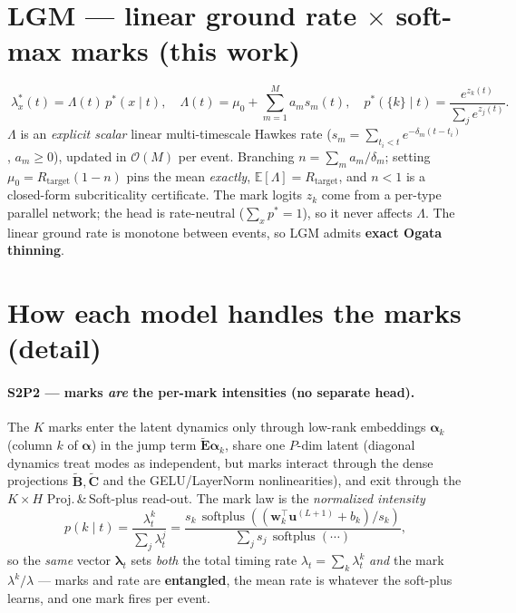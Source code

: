 \documentclass[11pt]{article}
\newcommand{\softplus}{\operatorname{softplus}}
\newcommand{\Lam}{\Lambda}
\begin{document}
\section{LGM --- linear ground rate $\times$ soft-max marks (this work)}
\[
\boxed{\;\lambda_x^*(t)=\Lam(t)\,p^*(x\mid t),\quad
\Lam(t)=\mu_0+\sum_{m=1}^{M}a_m s_m(t),\quad
p^*(\{k\}\mid t)=\frac{e^{z_k(t)}}{\sum_j e^{z_j(t)}}.\;}
\]
$\Lam$ is an \emph{explicit scalar} linear multi-timescale Hawkes rate
($s_m=\sum_{t_i<t}e^{-\delta_m(t-t_i)}$, $a_m\ge0$), updated in $\mathcal{O}(M)$ per event. Branching
$n=\sum_m a_m/\delta_m$; setting $\mu_0=R_{\mathrm{target}}(1-n)$ pins the mean \emph{exactly},
$\mathbb{E}[\Lam]=R_{\mathrm{target}}$, and $n<1$ is a closed-form subcriticality certificate.
The mark logits $z_k$ come from a per-type parallel network; the head is rate-neutral
($\sum_x p^*=1$), so it never affects $\Lam$. The linear ground rate is monotone between events,
so LGM admits \textbf{exact Ogata thinning}.

\section{How each model handles the marks (detail)}
\paragraph{S2P2 --- marks \emph{are} the per-mark intensities (no separate head).}
The $K$ marks enter the latent dynamics only through low-rank embeddings $\boldsymbol\alpha_k$
(column $k$ of $\boldsymbol\alpha$) in the jump term $\tilde{\mathbf E}\boldsymbol\alpha_k$, share one
$P$-dim latent (diagonal dynamics treat modes as independent, but marks interact through the dense
projections $\tilde{\mathbf B},\tilde{\mathbf C}$ and the GELU/LayerNorm nonlinearities), and exit
through the $K\times H$ Proj.\,\&\,Soft-plus read-out. The mark law is the \emph{normalized intensity}
\[
p(k\mid t)=\frac{\lambda^k_t}{\sum_{j}\lambda^j_t}
=\frac{s_k\,\softplus((\mathbf w_k^\top\mathbf u^{(L+1)}+b_k)/s_k)}{\sum_j s_j\,\softplus(\cdots)},
\]
so the \emph{same} vector $\boldsymbol\lambda_t$ sets \emph{both} the total timing rate
$\lambda_t=\sum_k\lambda^k_t$ \emph{and} the mark $\lambda^k/\lambda$ --- marks and rate are
\textbf{entangled}, the mean rate is whatever the soft-plus learns, and one mark fires per event.
\end{document}
